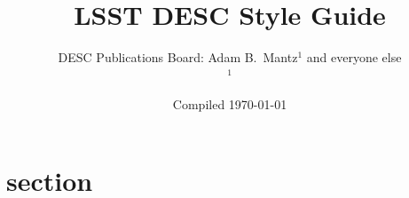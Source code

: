 \documentclass[letterpaper,11pt]{article}
\begin{document}

\title{\vspace{5cm}LSST DESC Style Guide}
\author{DESC Publications Board: Adam B.\ Mantz$^1$ and everyone else
  \smallskip\\{\small
    $^1$\suphysics
}}
\date{Compiled \today}
\maketitle
\thispagestyle{fancy}

\clearpage
\fancyhead{}
\fancyfoot[C]{\thepage}
\setcounter{page}{1}

\tableofcontents

\clearpage
{}
\setcounter{page}{1}

\section{section}



%
%
\end{document}
